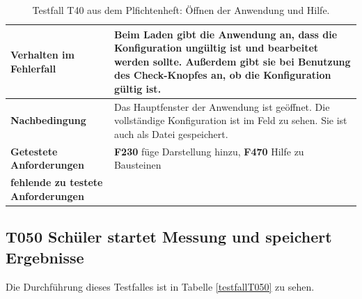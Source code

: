 \documentclass[parskip=full]{scrartcl}
\begin{document}
\begin{table}[h]
\begin{tabular}{| p{4cm} | p{10cm} |}
	\textbf{Verhalten im Fehlerfall}
	& 
	Beim Laden gibt die Anwendung an, dass die Konfiguration ungültig ist und bearbeitet werden sollte. Außerdem gibt sie bei Benutzung des Check-Knopfes an, ob die Konfiguration gültig ist.
	\\ \hline
	
	\textbf{Nachbedingung}
	& 
	Das Hauptfenster der Anwendung ist geöffnet. Die vollständige Konfiguration ist im Feld zu sehen.  Sie ist auch als Datei gespeichert.
	\\ \hline
	
	
	\textbf{Getestete Anforderungen}
	& 
	\textbf{F230} füge Darstellung hinzu, \textbf{F470} Hilfe zu Bausteinen
	\\ \hline
	\textbf{fehlende zu testete Anforderungen}
	& 
	
	\\ \hline
	
	
\end{tabular}
\caption{Testfall T40 aus dem Plfichtenheft: Öffnen der Anwendung und Hilfe.}
\label{testfallT40}
\end{table}

\subsection{\textbf{T050} Schüler startet Messung und speichert Ergebnisse}

Die Durchführung dieses Testfalles ist in Tabelle \ref{testfallT050} zu sehen.
\end{document}
